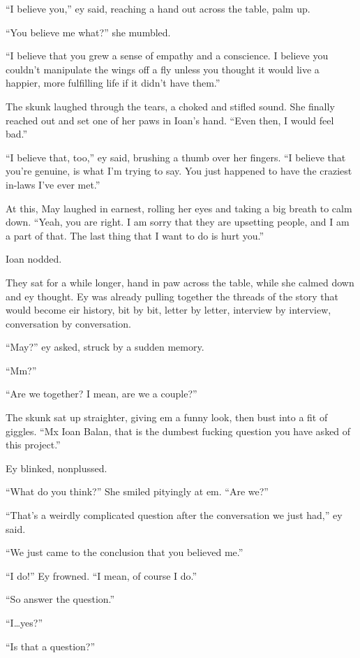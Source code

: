 ``I believe you,'' ey said, reaching a hand out across the table, palm up.

``You believe me what?'' she mumbled.

``I believe that you grew a sense of empathy and a conscience. I believe you couldn't manipulate the wings off a fly unless you thought it would live a happier, more fulfilling life if it didn't have them.''

The skunk laughed through the tears, a choked and stifled sound. She finally reached out and set one of her paws in Ioan's hand. ``Even then, I would feel bad.''

``I believe that, too,'' ey said, brushing a thumb over her fingers. ``I believe that you're genuine, is what I'm trying to say. You just happened to have the craziest in-laws I've ever met.''

At this, May laughed in earnest, rolling her eyes and taking a big breath to calm down. ``Yeah, you are right. I am sorry that they are upsetting people, and I am a part of that. The last thing that I want to do is hurt you.''

Ioan nodded.

They sat for a while longer, hand in paw across the table, while she calmed down and ey thought. Ey was already pulling together the threads of the story that would become eir history, bit by bit, letter by letter, interview by interview, conversation by conversation.

``May?'' ey asked, struck by a sudden memory.

``Mm?''

``Are we together? I mean, are we a couple?''

The skunk sat up straighter, giving em a funny look, then bust into a fit of giggles. ``Mx Ioan Balan, that is the dumbest fucking question you have asked of this project.''

Ey blinked, nonplussed.

``What do you think?'' She smiled pityingly at em. ``Are we?''

``That's a weirdly complicated question after the conversation we just had,'' ey said.

``We just came to the conclusion that you believed me.''

``I do!'' Ey frowned. ``I mean, of course I do.''

``So answer the question.''

``I\ldots yes?''

``Is that a question?''

